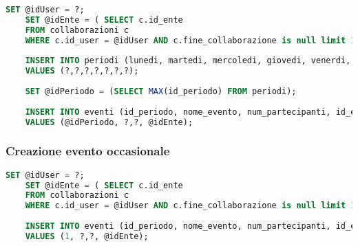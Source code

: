 \begin{lstlisting}[language=SQL]
	SET @idUser = ?;
	SET @idEnte = ( SELECT c.id_ente
	FROM collaborazioni c
	WHERE c.id_user = @idUser AND c.fine_collaborazione is null limit 1);
	
	INSERT INTO periodi (lunedi, martedi, mercoledi, giovedi, venerdi, sabato, domenica) 
	VALUES (?,?,?,?,?,?,?);
	
	SET @idPeriodo = (SELECT MAX(id_periodo) FROM periodi);
	
	INSERT INTO eventi (id_periodo, nome_evento, num_partecipanti, id_ente) 
	VALUES (@idPeriodo, ?,?, @idEnte);
\end{lstlisting}


\subsubsection{Creazione evento occasionale}
\begin{lstlisting}[language=SQL]
	SET @idUser = ?;
	SET @idEnte = ( SELECT c.id_ente
	FROM collaborazioni c
	WHERE c.id_user = @idUser AND c.fine_collaborazione is null limit 1);
	
	INSERT INTO eventi (id_periodo, nome_evento, num_partecipanti, id_ente) 
	VALUES (1, ?,?, @idEnte);
\end{lstlisting}